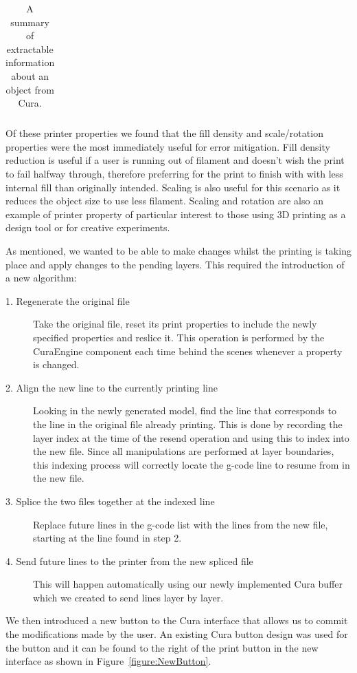 \documentclass[pdftex, 11pt]{report} %
\begin{document}
\begin{table}[h]
{\begin{minipage}{\textwidth}
\begin{tabular}{| p{3cm} | p{2cm} | p{8.5cm} |}
\end{tabular}
\caption{A summary of extractable information about an object from Cura.}
\label{table:CuraProperties}
\end{minipage} }
\end{table}

	Of these printer properties we found that the fill density and scale/rotation properties were the most immediately useful for error mitigation. Fill density reduction is useful if a user is running out of filament and doesn't wish the print to fail halfway through, therefore preferring for the print to finish with with less internal fill than originally intended. Scaling is also useful for this scenario as it reduces the object size to use less filament. Scaling and rotation are also an example of printer property of particular interest to those using 3D printing as a design tool or for creative experiments. 

	As mentioned, we wanted to be able to make changes whilst the printing is taking place and apply changes to the pending layers. This required the introduction of a new algorithm:

\begin{description}
\item[1. Regenerate the original file] Take the original file, reset its print properties to include the newly specified properties and reslice it. This operation is performed by the CuraEngine component each time behind the scenes whenever a property is changed.
\item[2. Align the new line to the currently printing line] Looking in the newly generated model, find the line that corresponds to the line in the original file already printing. This is done by recording the layer index at the time of the resend operation and using this to index into the new file. Since all manipulations are performed at layer boundaries, this indexing process will correctly locate the g-code line to resume from in the new file.
\item[3. Splice the two files together at the indexed line] Replace future lines in the g-code list with the lines from the new file, starting at the line found in step 2.
\item[4. Send future lines to the printer from the new spliced file] This will happen automatically using our newly implemented Cura buffer which we created to send lines layer by layer.
\end{description}

	We then introduced a new button to the Cura interface that allows us to commit the modifications made by the user. An existing Cura button design was used for the button and it can be found to the right of the print button in the new interface as shown in Figure~\ref{figure:NewButton}.
\end{document}
